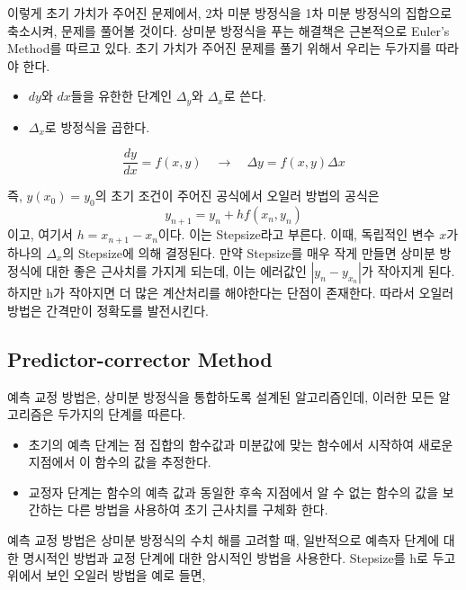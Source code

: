 \documentclass[11pt]{article}
\begin{document}
\noindent
이렇게 초기 가치가 주어진 문제에서, 2차 미분 방정식을 1차 미분 방정식의 집합으로 축소시켜, 문제를 풀어볼 것이다. 
상미분 방정식을 푸는 해결책은 근본적으로 Euler's Method를 따르고 있다. 초기 가치가 주어진 문제를 풀기 위해서 우리는 두가지를 따라야 한다.
\begin{itemize}
\item $dy$와 $dx$들을 유한한 단계인 $\Delta_{y}$와 $\Delta_{x}$로 쓴다.
\item $\Delta_{x}$로 방정식을 곱한다.
\end{itemize}


\begin{equation}
\frac{dy}{dx} = f(x, y)
\quad\rightarrow\quad
\Delta y = f(x, y) \Delta x
\end{equation}

\noindent
즉, $y(x_{0}) = y_{0}$의 초기 조건이 주어진 공식에서 오일러 방법의 공식은
\begin{equation}
y_{n + 1} = y_n + h f(x_n, y_n)
\end{equation}
이고, 여기서 $h = x_{n+1} - x_{n}$이다. 이는 Stepsize라고 부른다. 
이때, 독립적인 변수 $x$가 하나의 $\Delta_{x}$의 Stepsize에 의해 결정된다. 만약 Stepsize를 매우 작게 만들면 상미분 방정식에 대한 좋은 근사치를 가지게 되는데, 이는 에러값인 $|y_{n} - y_{x_{n}}|$가 작아지게 된다. 하지만 h가 작아지면 더 많은 계산처리를 해야한다는 단점이 존재한다. 따라서 오일러 방법은 간격만이 정확도를 발전시킨다.













\subsection{Predictor-corrector Method} 
예측 교정 방법은, 상미분 방정식을 통합하도록 설계된 알고리즘인데, 이러한 모든 알고리즘은 두가지의 단계를 따른다.
\begin{itemize}
\item 초기의 예측 단계는 점 집합의 함수값과 미분값에 맞는 함수에서 시작하여 새로운 지점에서 이 함수의 값을 추정한다.
\item 교정자 단계는 함수의 예측 값과 동일한 후속 지점에서 알 수 없는 함수의 값을 보간하는 다른 방법을 사용하여 초기 근사치를 구체화 한다.
\end{itemize}
\noindent
예측 교정 방법은 상미분 방정식의 수치 해를 고려할 때, 일반적으로 예측자 단계에 대한 명시적인 방법과 교정 단계에 대한 암시적인 방법을 사용한다. Stepsize를 h로 두고 위에서 보인 오일러 방법을 예로 들면,
\end{document}
